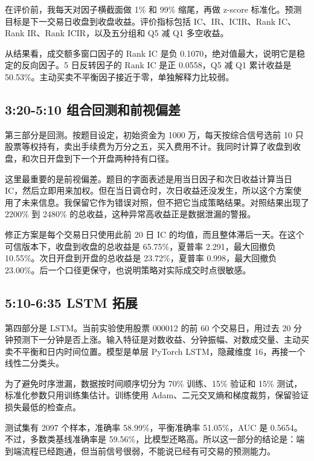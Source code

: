 \documentclass[
]{article}
\begin{document}
在评价前，我每天对因子横截面做 1\% 和 99\% 缩尾，再做 z-score
标准化。预测目标是下一交易日收盘到收盘收益。评价指标包括
IC、IR、ICIR、Rank IC、Rank IR、Rank ICIR，以及五分组和 Q5 减 Q1
多空收益。

从结果看，成交额多窗口因子的 Rank IC 是负
0.1070，绝对值最大，说明它是稳定的反向因子。5 日反转因子的 Rank IC 是正
0.0558，Q5 减 Q1 累计收益是
50.53\%。主动买卖不平衡因子接近于零，单独解释力比较弱。

\subsection{3:20-5:10
组合回测和前视偏差}\label{ux7ec4ux5408ux56deux6d4bux548cux524dux89c6ux504fux5dee}

第三部分是回测。按题目设定，初始资金为 1000 万，每天按综合信号选前 10
只股票等权持有，卖出手续费为万分之五，买入费用不计。我同时计算了收盘到收盘，和次日开盘到下一个开盘两种持有口径。

这里最重要的是前视偏差。题目的字面表述是用当日因子和次日收益计算当日
IC，然后立即用来加权。但在当日调仓时，次日收益还没发生，所以这个方案使用了未来信息。我保留它作为错误对照，但不把它当成策略结果。对照结果出现了
2200\% 到 2480\% 的总收益，这种异常高收益正是数据泄漏的警报。

修正方案是每个交易日只使用此前 20 日 IC
的均值，而且整体滞后一天。在这个可信版本下，收盘到收盘的总收益是
65.75\%，夏普率 2.291，最大回撤负 10.55\%。次日开盘到开盘的总收益是
23.72\%，夏普率 0.998，最大回撤负
23.00\%。后一个口径更保守，也说明策略对实际成交时点很敏感。

\subsection{5:10-6:35 LSTM 拓展}\label{lstm-ux62d3ux5c55}

第四部分是 LSTM。当前实验使用股票 000012 的前 60 个交易日，用过去 20
分钟预测下一分钟是否上涨。输入特征是对数收益、分钟振幅、对数成交量、主动买卖不平衡和日内时间位置。模型是单层
PyTorch LSTM，隐藏维度 16，再接一个线性二分类头。

为了避免时序泄漏，数据按时间顺序切分为 70\% 训练、15\% 验证和 15\%
测试，标准化参数只用训练集估计。训练使用
Adam、二元交叉熵和梯度裁剪，保留验证损失最低的检查点。

测试集有 2097 个样本，准确率 58.99\%，平衡准确率 51.05\%，AUC 是
0.5654。不过，多数类基线准确率是
59.56\%，比模型还略高。所以这一部分的结论是：端到端流程已经跑通，但当前信号很弱，不能说已经有可交易的预测能力。
\end{document}
